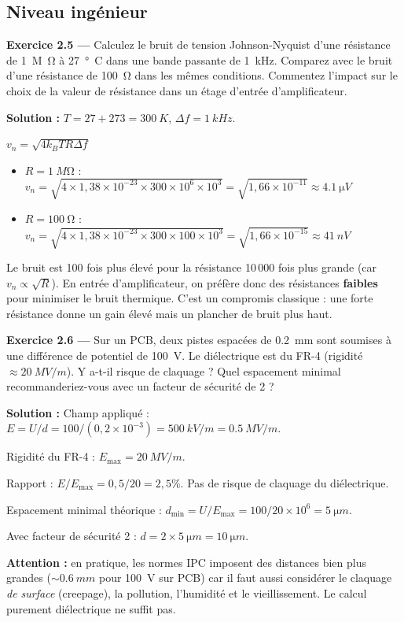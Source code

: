 \documentclass[12pt,a4paper,twoside]{book}
\begin{document}
\subsection*{Niveau ingénieur}

\textbf{Exercice 2.5 —} Calculez le bruit de tension Johnson-Nyquist d'une résistance de \SI{1}{M\ohm} à \SI{27}{°C} dans une bande passante de \SI{1}{kHz}. Comparez avec le bruit d'une résistance de \SI{100}{\ohm} dans les mêmes conditions. Commentez l'impact sur le choix de la valeur de résistance dans un étage d'entrée d'amplificateur.

\begin{pratique}
\textbf{Solution :} $T = 27 + 273 = \SI{300}{K}$, $\Delta f = \SI{1}{kHz}$.

$v_{n} = \sqrt{4 k_B T R \Delta f}$

\begin{itemize}[nosep]
\item $R = \SI{1}{M\ohm}$ : $v_n = \sqrt{4 \times 1{,}38\times10^{-23} \times 300 \times 10^6 \times 10^3} = \sqrt{1{,}66\times10^{-11}} \approx \SI{4.1}{\micro V}$
\item $R = \SI{100}{\ohm}$ : $v_n = \sqrt{4 \times 1{,}38\times10^{-23} \times 300 \times 100 \times 10^3} = \sqrt{1{,}66\times10^{-15}} \approx \SI{41}{nV}$
\end{itemize}

Le bruit est 100 fois plus élevé pour la résistance 10\,000 fois plus grande (car $v_n \propto \sqrt{R}$). En entrée d'amplificateur, on préfère donc des résistances \textbf{faibles} pour minimiser le bruit thermique. C'est un compromis classique : une forte résistance donne un gain élevé mais un plancher de bruit plus haut.
\end{pratique}

\textbf{Exercice 2.6 —} Sur un PCB, deux pistes espacées de \SI{0.2}{mm} sont soumises à une différence de potentiel de \SI{100}{V}. Le diélectrique est du FR-4 (rigidité $\approx \SI{20}{MV/m}$). Y a-t-il risque de claquage ? Quel espacement minimal recommanderiez-vous avec un facteur de sécurité de 2 ?

\begin{pratique}
\textbf{Solution :} Champ appliqué : $E = U/d = 100 / (0{,}2\times10^{-3}) = \SI{500}{kV/m} = \SI{0.5}{MV/m}$.

Rigidité du FR-4 : $E_{\max} = \SI{20}{MV/m}$.

Rapport : $E/E_{\max} = 0{,}5/20 = 2{,}5\%$. Pas de risque de claquage du diélectrique.

Espacement minimal théorique : $d_{\min} = U/E_{\max} = 100/20\times10^6 = \SI{5}{\micro m}$.

Avec facteur de sécurité 2 : $d = 2 \times \SI{5}{\micro m} = \SI{10}{\micro m}$.

\textbf{Attention :} en pratique, les normes IPC imposent des distances bien plus grandes ($\sim\SI{0.6}{mm}$ pour \SI{100}{V} sur PCB) car il faut aussi considérer le claquage \textit{de surface} (creepage), la pollution, l'humidité et le vieillissement. Le calcul purement diélectrique ne suffit pas.
\end{pratique}
\end{document}
